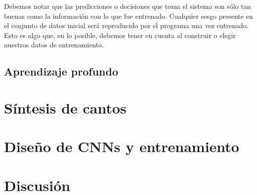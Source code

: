 \documentclass[12pt,twoside,a4paper]{article}
\begin{document}
Debemos notar que las predicciones o decisiones que toma el sistema son sólo tan buenas como la información con la que fue entrenado. Cualquier sesgo presente en el conjunto de datos inicial será reproducido por el programa una vez entrenado. Esto es algo que, en lo posible, debemos tener en cuenta al construir o elegir nuestros datos de entrenamiento.

\subsection{Aprendizaje profundo}

\section{Síntesis de cantos}
\label{sec:sintesis}

\section{Diseño de CNNs y entrenamiento}
\label{sec:resultados}

\section{Discusión}
\label{sec:discusion}


\printbibliography[heading=bibintoc]
\end{document}
